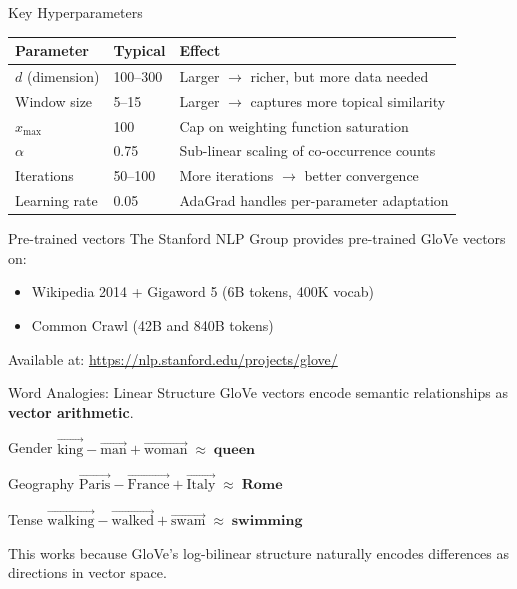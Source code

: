 \documentclass[11pt,aspectratio=169,professionalfonts]{beamer}
\begin{document}
\begin{frame}{Key Hyperparameters}
  \centering
  \small
  \begin{tabular}{l l l}
    \toprule
    \textbf{Parameter} & \textbf{Typical} & \textbf{Effect} \\
    \midrule
    $d$ (dimension)    & 100--300   & Larger $\rightarrow$ richer, but more data needed \\
    Window size        & 5--15      & Larger $\rightarrow$ captures more topical similarity \\
    $x_{\max}$         & 100        & Cap on weighting function saturation \\
    $\alpha$           & 0.75       & Sub-linear scaling of co-occurrence counts \\
    Iterations         & 50--100    & More iterations $\rightarrow$ better convergence \\
    Learning rate      & 0.05       & AdaGrad handles per-parameter adaptation \\
    \bottomrule
  \end{tabular}

  \vspace{10pt}
  \begin{block}{Pre-trained vectors}
    The Stanford NLP Group provides pre-trained GloVe vectors on:
    \begin{itemize}
      \item Wikipedia 2014 + Gigaword 5 (6B tokens, 400K vocab)
      \item Common Crawl (42B and 840B tokens)
    \end{itemize}
    Available at: \url{https://nlp.stanford.edu/projects/glove/}
  \end{block}
\end{frame}
%
%
\begin{frame}{Word Analogies: Linear Structure}
  GloVe vectors encode semantic relationships as \textbf{vector arithmetic}.

  \vspace{6pt}
  \begin{exampleblock}{Gender}
    \large\centering
    $\vec{\text{king}} - \vec{\text{man}} + \vec{\text{woman}} \;\approx\; \textbf{queen}$
  \end{exampleblock}
  \vspace{2pt}

  \begin{exampleblock}{Geography}
    \large\centering
    $\vec{\text{Paris}} - \vec{\text{France}} + \vec{\text{Italy}} \;\approx\; \textbf{Rome}$
  \end{exampleblock}
  \vspace{2pt}

  \begin{exampleblock}{Tense}
    \large\centering
    $\vec{\text{walking}} - \vec{\text{walked}} + \vec{\text{swam}} \;\approx\; \textbf{swimming}$
  \end{exampleblock}

  \vspace{4pt}
  This works because GloVe's log-bilinear structure naturally encodes differences as directions in vector space.
\end{frame}
\end{document}
